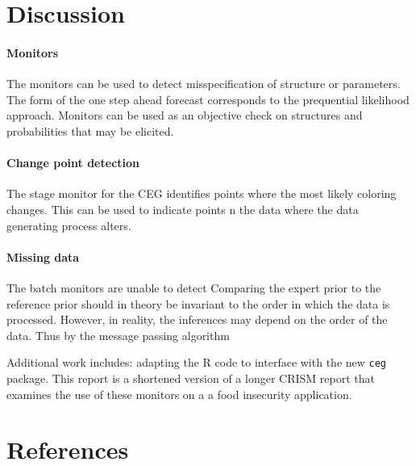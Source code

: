 \documentclass[12pt]{article}
\begin{document}
%
%
%
% 
%    
%




\section{Discussion}
 
\paragraph{Monitors}
The monitors can be used to detect misspecification of structure or parameters. The form of the one step ahead forecast corresponds to the prequential likelihood approach. Monitors can be used as an objective check on structures and probabilities that may be elicited. 

\paragraph{Change point detection} 
The stage monitor for the CEG identifies points where the most likely coloring changes. This can be used to indicate points n the data where the data generating process alters. 

\paragraph{Missing data} The batch monitors are unable to detect 
Comparing the expert prior to the reference prior should in theory be invariant to the order in which the data is processed. However, in reality, the inferences may depend on the order of the data. Thus by the message passing algorithm 

Additional work includes: adapting the R code to interface with the new \texttt{ceg} package. This report is a shortened version of a longer CRISM report that examines the use of these monitors on a a food insecurity application.  

\section{References}  
\end{document}
